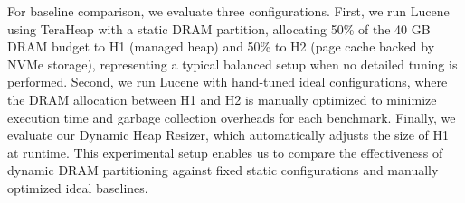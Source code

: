 For baseline comparison, we evaluate three configurations. First, we run Lucene
using TeraHeap with a static DRAM partition, allocating 50\% of the 40 GB DRAM
budget to H1 (managed heap) and 50\% to H2 (page cache backed by NVMe storage),
representing a typical balanced setup when no detailed tuning is performed.
%
Second, we run Lucene with hand-tuned ideal configurations, where the DRAM
allocation between H1 and H2 is manually optimized to minimize execution time
and garbage collection overheads for each benchmark. 
%
Finally, we evaluate our
Dynamic Heap Resizer, which automatically adjusts the size of H1 at runtime.
This experimental setup enables us to compare the effectiveness of dynamic DRAM
partitioning against fixed static configurations and manually optimized ideal
baselines.
